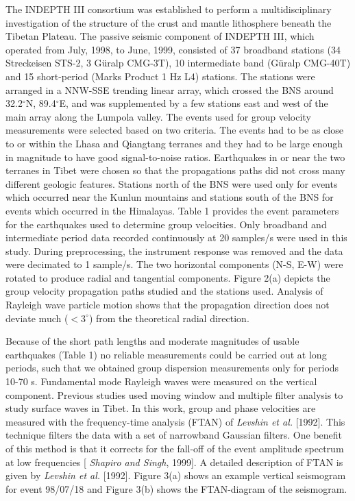 \documentclass[12pt]{article}
\begin{document}
The INDEPTH III consortium was established to perform a multidisciplinary investigation of the structure of 
the crust and mantle lithosphere beneath the Tibetan Plateau.  The passive seismic component of INDEPTH III, 
which operated from July, 1998, to June, 1999, consisted of 37 broadband
stations (34 Streckeisen STS-2, 3 G\"uralp 
CMG-3T), 10 intermediate band (G\"uralp CMG-40T) and 15 short-period (Marks Product 1 Hz L4) stations.  The 
stations were arranged in a NNW-SSE trending linear array, which crossed the BNS around 32.2$^\circ$N, 
89.4$^\circ$E, and was supplemented by a few stations east and west of the main array along the Lumpola 
valley.  The events used for group velocity measurements were selected based on two criteria.  The events had to be as close 
to or within the Lhasa and Qiangtang terranes and they had to be large enough in magnitude to have good 
signal-to-noise ratios. Earthquakes in or near the two terranes in Tibet were chosen so that the 
propagations paths did not cross many different geologic features. Stations north of the BNS were used only 
for events which occurred near the Kunlun mountains and stations south of the BNS for events which occurred 
in the Himalayas.   Table 1 provides the event parameters for the earthquakes used to determine group 
velocities.  Only broadband and intermediate period data recorded continuously at 20 samples/s were used in 
this study.  During preprocessing, the instrument response was removed and the data were decimated to 1 
sample/s.  The two horizontal components (N-S, E-W) were rotated to produce radial and tangential 
components.  Figure 2(a) depicts the group velocity propagation paths studied and the stations used.  
Analysis of Rayleigh wave particle motion shows that the propagation direction does not deviate much 
($<3^\circ$) from the theoretical radial direction. 

Because of the short path lengths and moderate magnitudes of usable earthquakes (Table 1) no reliable 
measurements could be carried out at long periods, such that we obtained group dispersion measurements 
only for periods 10-70 s.  Fundamental mode Rayleigh waves were measured on the vertical component. Previous 
studies used moving window and multiple filter analysis to study surface waves in Tibet.  In this work, 
group and phase velocities are measured with the frequency-time analysis (FTAN) of {\it Levshin et al.} 
[1992].  This technique filters the data with a set of narrowband Gaussian filters.  One benefit of this 
method is that it corrects for the fall-off of the event amplitude spectrum at low frequencies [{\it 
Shapiro and Singh}, 1999].  A detailed description of FTAN is given by {\it Levshin et al.} [1992].  Figure 
3(a) shows an example vertical seismogram for event 98/07/18 and Figure 3(b) shows the FTAN-diagram of the 
seismogram. 
\end{document}
